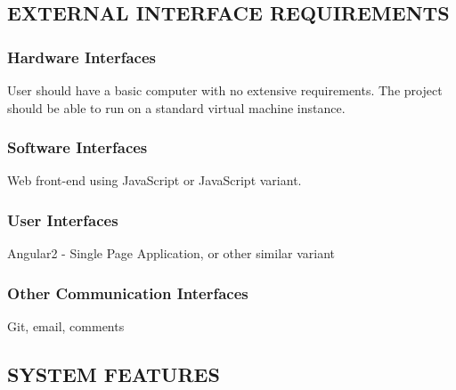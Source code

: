 \documentclass[letterpaper, 10pt, draftclsnofoot, compsoc, onecolumn]{IEEEtran}
\begin{document}
{{\subsection[EXTERNAL INTERFACE REQUIREMENTS]{\rmfamily\bfseries\color{black} EXTERNAL INTERFACE REQUIREMENTS}

\subsubsection[Hardware Interfaces]{\rmfamily\bfseries\color{black} Hardware Interfaces}
{\noindent 
User should have a basic computer 
with no extensive requirements. The project should be able to run on a standard virtual machine 
instance.}

\subsubsection[Software Interfaces]{\rmfamily\bfseries\color{black} Software Interfaces}
{\noindent 
Web front-end using JavaScript or JavaScript variant.}

\subsubsection[User Interfaces]{\rmfamily\bfseries\color{black} User Interfaces}
{\noindent 
Angular2 - Single Page Application, or other similar variant}

\subsubsection[Other Communication Interfaces]{\rmfamily\bfseries\color{black} Other Communication Interfaces}
{\noindent 
Git, email, comments}


\bigskip

\clearpage
\subsection[SYSTEM FEATURES]{\rmfamily\bfseries\color{black} SYSTEM FEATURES}

}}
\end{document}
